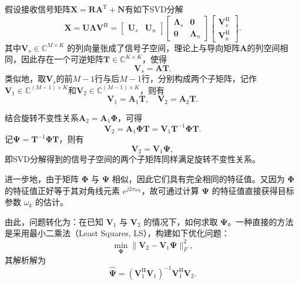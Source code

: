 假设接收信号矩阵\( \mathbf{X} = \mathbf{R} \mathbf{A}^{\mathrm{T}} + \mathbf{N} \)有如下SVD分解
\[
    \mathbf{X} = \mathbf{U} \mathbf{\Lambda} \mathbf{V}^{\mathrm{H}} = \begin{bmatrix}
        \mathbf{U}_s & \mathbf{U}_n
    \end{bmatrix} \begin{bmatrix}
        \mathbf{\Lambda}_s & \mathbf{0}         \\
        \mathbf{0}         & \mathbf{\Lambda}_n
    \end{bmatrix} \begin{bmatrix}
        \mathbf{V}_s^{\mathrm{H}} \\
        \mathbf{V}_n^{\mathrm{H}}
    \end{bmatrix}.
\]
其中\( \mathbf{V}_s \in \mathbb{C}^{M \times K} \) 的列向量张成了信号子空间，理论上与导向矩阵\( \mathbf{A} \)的列空间相同，因此存在一个可逆矩阵\( \mathbf{T} \in \mathbb{C}^{K \times K} \)，使得
\[
    \mathbf{V}_s = \mathbf{A} \mathbf{T}.
\]
类似地，取\( \mathbf{V}_s \)的前\( M-1 \)行与后\( M-1 \)行，分别构成两个子矩阵，记作\( \mathbf{V}_1 \in \mathbb{C}^{(M-1) \times K} \)和\( \mathbf{V}_2 \in \mathbb{C}^{(M-1) \times K} \)，则有
\[
    \mathbf{V}_1 = \mathbf{A}_1 \mathbf{T}, \quad \mathbf{V}_2 = \mathbf{A}_2 \mathbf{T}.
\]

结合旋转不变性关系\( \mathbf{A}_2 = \mathbf{A}_1 \mathbf{\Phi} \)，可得
\[
    \mathbf{V}_2 = \mathbf{A}_1 \mathbf{\Phi} \mathbf{T} = \mathbf{V}_1 \mathbf{T}^{-1} \mathbf{\Phi} \mathbf{T}.
\]
记\( \mathbf{\Psi} = \mathbf{T}^{-1} \mathbf{\Phi} \mathbf{T} \)，则有
\[
    \mathbf{V}_2 = \mathbf{V}_1 \mathbf{\Psi},
\]
即SVD分解得到的信号子空间的两个子矩阵同样满足旋转不变性关系。

进一步地，由于矩阵 \( \mathbf{\Phi} \) 与 \( \mathbf{\Psi} \) 相似，因此它们具有完全相同的特征值。又因为 \( \mathbf{\Phi} \) 的特征值正好等于其对角线元素 \( e^{j2\pi\omega_k} \)，故可通过计算 \( \mathbf{\Psi} \) 的特征值直接获得目标参数 \( \omega_k \) 的估计。

由此，问题转化为：在已知 \( \mathbf{V}_1 \) 与 \( \mathbf{V}_2 \) 的情况下，如何求取 \( \mathbf{\Psi} \)。一种直接的方法是采用最小二乘法（Least Squares, LS），构建如下优化问题：
\[
    \min_{\mathbf{\Psi}} \|\mathbf{V}_2 - \mathbf{V}_1 \mathbf{\Psi}\|_F^2,
\]
其解析解为
\[
    \hat{\mathbf{\Psi}} = (\mathbf{V}_1^{\mathrm{H}} \mathbf{V}_1)^{-1} \mathbf{V}_1^{\mathrm{H}} \mathbf{V}_2.
\]

